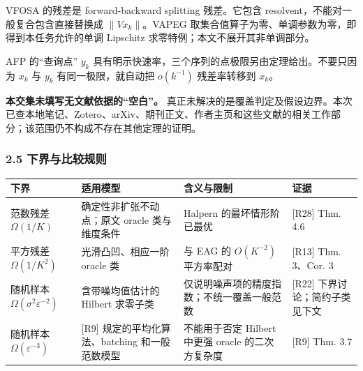 \documentclass[
  chinese,
  10pt,
  a4paper,
]{article}
\newcounter{none} %
\begin{document}
VFOSA 的残差是 forward-backward splitting 残差。它包含
resolvent，不能对一般复合包含直接替换成 \(\lVert Vx_k\rVert\)。VAPEG
取集合值算子为零、单调参数为零，即得到本任务允许的单调 Lipschitz
求零特例；本文不展开其非单调部分。

AFP 的``查询点'' \(y_k\)
具有明示快速率，三个序列的点极限另由定理给出。不要只因为 \(x_k\) 与
\(y_k\) 有同一极限，就自动把 \(o(k^{-1})\) 残差率转移到 \(x_k\)。

\textbf{本交集未填写无文献依据的``空白''。}
真正未解决的是覆盖判定及假设边界。本次已查本地笔记、Zotero、arXiv、期刊正文、作者主页和这些文献的相关工作部分；该范围仍不构成不存在其他定理的证明。

\subsubsection{2.5
下界与比较规则}\label{ux4e0bux754cux4e0eux6bd4ux8f83ux89c4ux5219}

{\def\LTcaptype{none} %
\begin{longtable}[]{@{}
  >{\raggedright\arraybackslash}p{}
  >{\raggedright\arraybackslash}p{}
  >{\raggedright\arraybackslash}p{}
  >{\raggedright\arraybackslash}p{}@{}}
\toprule\noalign{}
\begin{minipage}[b]{\linewidth}\raggedright
下界
\end{minipage} & \begin{minipage}[b]{\linewidth}\raggedright
适用模型
\end{minipage} & \begin{minipage}[b]{\linewidth}\raggedright
含义与限制
\end{minipage} & \begin{minipage}[b]{\linewidth}\raggedright
证据
\end{minipage} \\
\midrule\noalign{}
\endhead
\bottomrule\noalign{}
\endlastfoot
范数残差 \(\Omega(1/K)\) & 确定性非扩张不动点；原文 oracle 类与维度条件
& Halpern 的最坏情形阶已最优 & {[}R28{]} Thm. 4.6 \\
平方残差 \(\Omega(1/K^2)\) & 光滑凸凹、相应一阶 oracle 类 & 与 EAG 的
\(O(K^{-2})\) 平方率配对 & {[}R13{]} Thm. 3、Cor. 3 \\
随机样本 \(\Omega(\sigma^2\varepsilon^{-2})\) & 含带噪均值估计的 Hilbert
求零子类 & 仅说明噪声项的精度指数；不统一覆盖一般范数 & {[}R22{]}
下界讨论；简约子类见下文 \\
随机样本 \(\Omega(\varepsilon^{-3})\) & {[}R9{]}
规定的平均化算法、batching 和一般范数模型 & 不能用于否定 Hilbert 中更强
oracle 的二次方复杂度 & {[}R9{]} Thm. 3.7 \\
\end{longtable}
}
\end{document}
